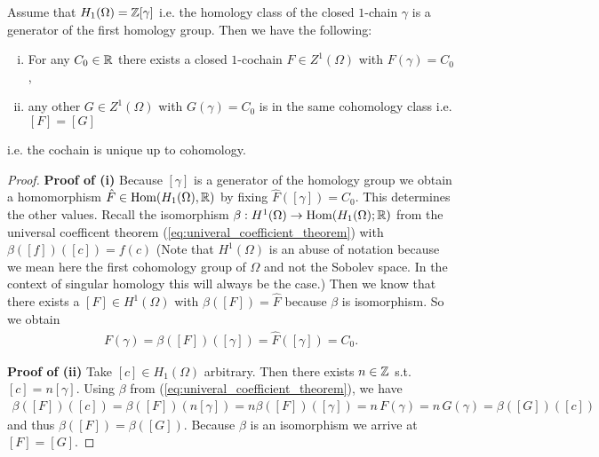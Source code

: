 \documentclass[../master_thesis.tex]{subfiles}
\begin{document}
\begin{proposition}\label{prop:uniqueness_cochain}
    Assume that $H_1(\Omega) = \mathbb{Z} [\gamma]$ i.e. the homology 
    class of the 
    closed $1$-chain $\gamma$ is a generator of the first homology group.
    Then we have the following:
    \begin{enumerate}[(i)]
        \item For any $C_0 \in \mathbb{R}$ there exists a closed $1$-cochain 
            $F \in Z^1(\Omega)$ with $F(\gamma) = C_0$,
        \item any other $G \in Z^1(\Omega)$ with $G(\gamma) = C_0$ 
            is in the same cohomology class i.e. $[F] = [G]$
    \end{enumerate}
    i.e. the cochain is unique up to cohomology.
\end{proposition}
\begin{proof}
    \textbf{Proof of (i)} %
    Because $[\gamma]$ is a generator of the homology group we  obtain a 
    homomorphism $\hat{F} \in \text{Hom}(H_1(\Omega),\mathbb{R})$ by fixing
    $\hat{F}([\gamma]) = C_0$. 
    This determines the other values.
    Recall the isomorphism $\beta : H^1(\Omega) \rightarrow 
    \text{Hom}(H_1(\Omega);\mathbb{R})$ from the universal coefficent theorem 
    (\ref{eq:univeral_coefficient_theorem}) with 
    $\beta([f])([c]) = f(c)$
    (Note that $H^1(\Omega)$ is an abuse of notation 
    because we mean here the first cohomology group of $\Omega$ and not the 
    Sobolev space. In the context of singular homology this will always be the
    case.)
    Then we know that there exists
    a $[F] \in H^1(\Omega)$ with $\beta([F]) = \hat{F}$ because $\beta$ is 
    isomorphism. So we obtain
    \begin{align*}
        F(\gamma) = \beta([F])([\gamma]) = \hat{F}([\gamma]) = C_0.
    \end{align*}

    \textbf{Proof of (ii)} %
    Take $[c] \in H_1(\Omega)$ arbitrary. 
    Then there exists  $n \in \mathbb{Z}$ s.t.
    $[c] = n [\gamma]$.
    Using $\beta$ from (\ref{eq:univeral_coefficient_theorem}),
    we have
    \begin{align*}
        \beta([F])([c]) = \beta([F])(n [\gamma]) 
        = n \beta([F])([\gamma]) = n \, F(\gamma) = n \, G(\gamma) = 
        \beta([G])([c])
    \end{align*}
    and thus $\beta([F]) = \beta([G])$. Because $\beta$ is an isomorphism
    we arrive at $[F] = [G]$.
\end{proof}
\end{document}
